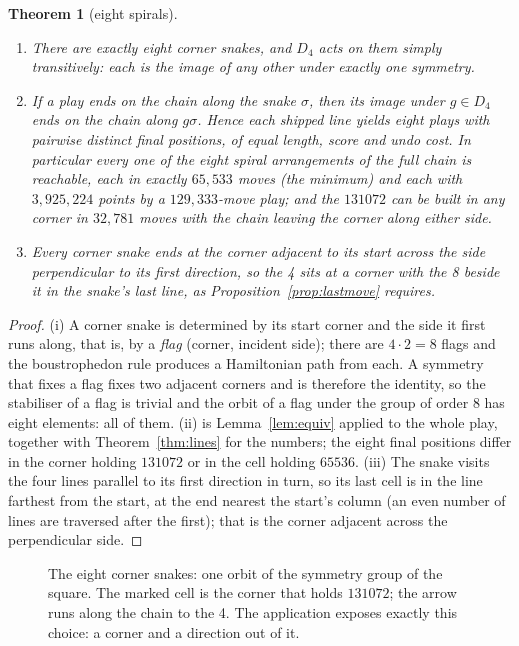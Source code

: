 \documentclass[11pt]{article}
\newtheorem{theorem}{Theorem}
\theoremstyle{definition}
\theoremstyle{remark}
\newcommand{\Dfour}{D_4}
\begin{document}
\begin{theorem}[eight spirals]\label{thm:eight}
\begin{enumerate}[nosep,label=(\roman*)]
\item There are exactly eight corner snakes, and $\Dfour$ acts on them
simply transitively: each is the image of any other under exactly one
symmetry.
\item If a play ends on the chain along the snake $\sigma$, then its image
under $g\in\Dfour$ ends on the chain along $g\sigma$. Hence each shipped
line yields eight plays with pairwise distinct final positions, of equal
length, score and undo cost. In particular every one of the eight spiral
arrangements of the full chain is reachable, each in exactly $65{,}533$
moves (the minimum) and each with $3{,}925{,}224$ points by a
$129{,}333$-move play; and the $131072$ can be built in any corner in
$32{,}781$ moves with the chain leaving the corner along either side.
\item Every corner snake ends at the corner adjacent to its start across
the side perpendicular to its first direction, so the 4 sits at a corner
with the 8 beside it in the snake's last line, as
Proposition~\ref{prop:lastmove} requires.
\end{enumerate}
\end{theorem}
\begin{proof}
(i) A corner snake is determined by its start corner and the side it first
runs along, that is, by a \emph{flag} (corner, incident side); there are
$4\cdot2=8$ flags and the boustrophedon rule produces a Hamiltonian path
from each. A symmetry that fixes a flag fixes two adjacent corners and is
therefore the identity, so the stabiliser of a flag is trivial and the
orbit of a flag under the group of order 8 has eight elements: all of
them. (ii) is Lemma~\ref{lem:equiv} applied to the whole play, together
with Theorem~\ref{thm:lines} for the numbers; the eight final positions
differ in the corner holding $131072$ or in the cell holding $65536$.
(iii) The snake visits the four lines parallel to its first direction in
turn, so its last cell is in the line farthest from the start, at the end
nearest the start's column (an even number of lines are traversed after
the first); that is the corner adjacent across the perpendicular side.
\end{proof}

\begin{figure}[t]
\centering
\FigEightSnakes
\caption{The eight corner snakes: one orbit of the symmetry group of the
square. The marked cell is the corner that holds $131072$; the arrow runs
along the chain to the 4. The application exposes exactly this choice: a
corner and a direction out of it.}
\label{fig:eight}
\end{figure}
\end{document}
